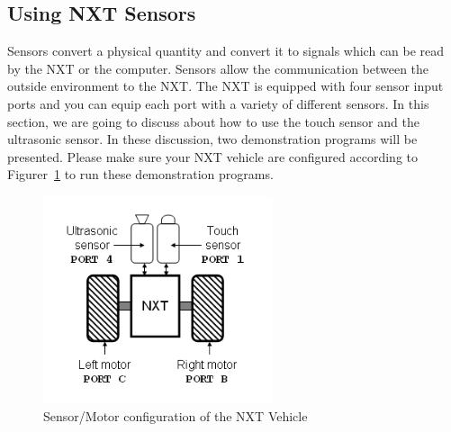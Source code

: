 \documentclass[11pt]{article}
\begin{document}
\subsection{Using NXT Sensors}
Sensors convert a physical quantity and convert it to signals which can be read 
by the NXT or the computer. Sensors allow the communication between the outside 
environment to the NXT. The NXT is equipped with four sensor input ports and you 
can equip each port with a variety of different sensors. In this section, we are 
going to discuss about how to use the touch sensor and the ultrasonic sensor. In 
these discussion, two demonstration programs will be presented. Please make sure 
your NXT vehicle are configured according to Figurer~\ref{fig_NXT_sensport} to 
run these demonstration programs.
\begin{figure}[H]
  \begin{center}
    \includegraphics[height=2.4in]{figure/mindstorm/NXT_auto.png}
    \caption{Sensor/Motor configuration of the NXT Vehicle \label{fig_NXT_sensport}}
  \end{center}
\end{figure}
\end{document}
